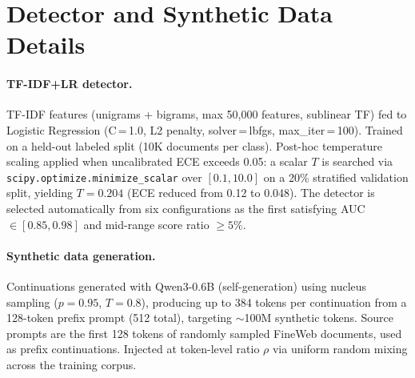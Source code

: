 \begin{table}[h]
\centering
\small
{}
\caption{Detector comparison for adaptive reweighting ($\rho{=}0.4$, $\tau{=}0.8$, 3 seeds).
Uniform baseline PPL\,=\,17.694.
$\Delta$ = Adaptive $-$ Uniform (negative is better).
TF-IDF+LR calibrated via temperature scaling.
The $\tau$ confound is conservative: TF-IDF+LR at $\tau{=}0.7$ achieves 17.674 (Table~\ref{tab:main}).}
\label{tab:detector}
\end{table}

\section{Detector and Synthetic Data Details}
\label{app:detector_details}

\paragraph{TF-IDF+LR detector.}
TF-IDF features (unigrams + bigrams, max 50{,}000 features, sublinear TF) fed to Logistic Regression (C\,=\,1.0, L2 penalty, solver\,=\,lbfgs, max\_iter\,=\,100).
Trained on a held-out labeled split (10K documents per class).
Post-hoc temperature scaling applied when uncalibrated ECE exceeds 0.05: a scalar $T$ is searched via \texttt{scipy.optimize.minimize\_scalar} over $[0.1, 10.0]$ on a 20\% stratified validation split, yielding $T{=}0.204$ (ECE reduced from 0.12 to 0.048).
The detector is selected automatically from six configurations as the first satisfying AUC $\in [0.85, 0.98]$ and mid-range score ratio $\geq 5\%$.

\paragraph{Synthetic data generation.}
Continuations generated with Qwen3-0.6B (self-generation) using nucleus sampling ($p{=}0.95$, $T{=}0.8$), producing up to 384 tokens per continuation from a 128-token prefix prompt (512 total), targeting ${\sim}$100M synthetic tokens.
Source prompts are the first 128 tokens of randomly sampled FineWeb documents, used as prefix continuations.
Injected at token-level ratio $\rho$ via uniform random mixing across the training corpus.

